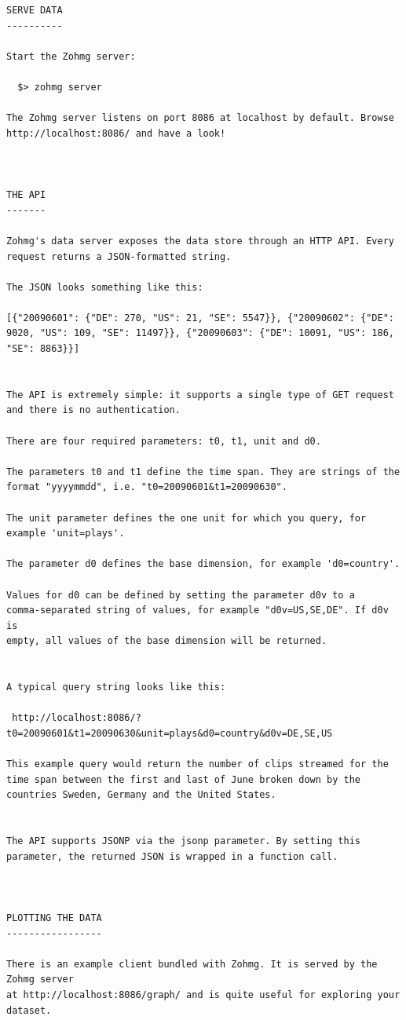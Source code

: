 \begin{verbatim}
SERVE DATA
----------

Start the Zohmg server:

  $> zohmg server

The Zohmg server listens on port 8086 at localhost by default. Browse
http://localhost:8086/ and have a look!



THE API
-------

Zohmg's data server exposes the data store through an HTTP API. Every
request returns a JSON-formatted string.

The JSON looks something like this:

[{"20090601": {"DE": 270, "US": 21, "SE": 5547}}, {"20090602": {"DE":
9020, "US": 109, "SE": 11497}}, {"20090603": {"DE": 10091, "US": 186,
"SE": 8863}}]


The API is extremely simple: it supports a single type of GET request
and there is no authentication.

There are four required parameters: t0, t1, unit and d0.

The parameters t0 and t1 define the time span. They are strings of the
format "yyyymmdd", i.e. "t0=20090601&t1=20090630".

The unit parameter defines the one unit for which you query, for
example 'unit=plays'.

The parameter d0 defines the base dimension, for example 'd0=country'.

Values for d0 can be defined by setting the parameter d0v to a
comma-separated string of values, for example "d0v=US,SE,DE". If d0v is
empty, all values of the base dimension will be returned.


A typical query string looks like this:

 http://localhost:8086/?t0=20090601&t1=20090630&unit=plays&d0=country&d0v=DE,SE,US

This example query would return the number of clips streamed for the
time span between the first and last of June broken down by the
countries Sweden, Germany and the United States.


The API supports JSONP via the jsonp parameter. By setting this
parameter, the returned JSON is wrapped in a function call.



PLOTTING THE DATA
-----------------

There is an example client bundled with Zohmg. It is served by the Zohmg server
at http://localhost:8086/graph/ and is quite useful for exploring your dataset.


\end{verbatim}
